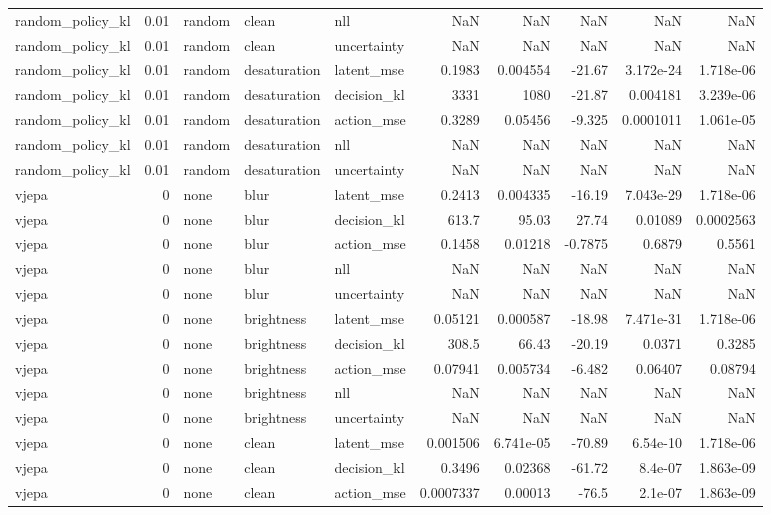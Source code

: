 \begin{tabular}{lrlllrrrrr}
random\_policy\_kl & 0.01 & random & clean & nll & NaN & NaN & NaN & NaN & NaN \\
random\_policy\_kl & 0.01 & random & clean & uncertainty & NaN & NaN & NaN & NaN & NaN \\
random\_policy\_kl & 0.01 & random & desaturation & latent\_mse & 0.1983 & 0.004554 & -21.67 & 3.172e-24 & 1.718e-06 \\
random\_policy\_kl & 0.01 & random & desaturation & decision\_kl & 3331 & 1080 & -21.87 & 0.004181 & 3.239e-06 \\
random\_policy\_kl & 0.01 & random & desaturation & action\_mse & 0.3289 & 0.05456 & -9.325 & 0.0001011 & 1.061e-05 \\
random\_policy\_kl & 0.01 & random & desaturation & nll & NaN & NaN & NaN & NaN & NaN \\
random\_policy\_kl & 0.01 & random & desaturation & uncertainty & NaN & NaN & NaN & NaN & NaN \\
vjepa & 0 & none & blur & latent\_mse & 0.2413 & 0.004335 & -16.19 & 7.043e-29 & 1.718e-06 \\
vjepa & 0 & none & blur & decision\_kl & 613.7 & 95.03 & 27.74 & 0.01089 & 0.0002563 \\
vjepa & 0 & none & blur & action\_mse & 0.1458 & 0.01218 & -0.7875 & 0.6879 & 0.5561 \\
vjepa & 0 & none & blur & nll & NaN & NaN & NaN & NaN & NaN \\
vjepa & 0 & none & blur & uncertainty & NaN & NaN & NaN & NaN & NaN \\
vjepa & 0 & none & brightness & latent\_mse & 0.05121 & 0.000587 & -18.98 & 7.471e-31 & 1.718e-06 \\
vjepa & 0 & none & brightness & decision\_kl & 308.5 & 66.43 & -20.19 & 0.0371 & 0.3285 \\
vjepa & 0 & none & brightness & action\_mse & 0.07941 & 0.005734 & -6.482 & 0.06407 & 0.08794 \\
vjepa & 0 & none & brightness & nll & NaN & NaN & NaN & NaN & NaN \\
vjepa & 0 & none & brightness & uncertainty & NaN & NaN & NaN & NaN & NaN \\
vjepa & 0 & none & clean & latent\_mse & 0.001506 & 6.741e-05 & -70.89 & 6.54e-10 & 1.718e-06 \\
vjepa & 0 & none & clean & decision\_kl & 0.3496 & 0.02368 & -61.72 & 8.4e-07 & 1.863e-09 \\
vjepa & 0 & none & clean & action\_mse & 0.0007337 & 0.00013 & -76.5 & 2.1e-07 & 1.863e-09 \\

\end{tabular}
